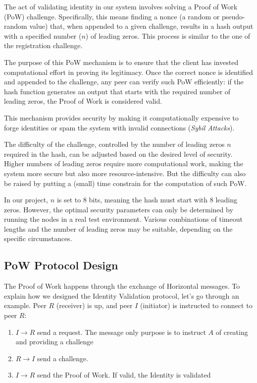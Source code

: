 \documentclass[a4paper,english,10pt,NET]{tumarticle}
\begin{document}
The act of validating identity in our system involves solving a Proof of Work (PoW) challenge. Specifically, this means finding a nonce (a random or pseudo-random value) that, when appended to a given challenge, results in a hash output with a specified number ($n$) of leading zeros. This process is similar to the one of the registration challenge.

The purpose of this PoW mechanism is to ensure that the client has invested computational effort in proving its legitimacy. Once the correct nonce is identified and appended to the challenge, any peer can verify such PoW efficiently: if the hash function generates an output that starts with the required number of leading zeros, the Proof of Work is considered valid.

This mechanism provides security by making it computationally expensive to forge identities or spam the system with invalid connections (\textit{Sybil Attacks}). 

The difficulty of the challenge, controlled by the number of leading zeros $n$ required in the hash, can be adjusted based on the desired level of security. Higher numbers of leading zeros require more computational work, making the system more secure but also more resource-intensive. But the difficulty can also be raised by putting a (small) time constrain for the computation of such PoW.

In our project, $n$ is set to 8 bits, meaning the hash must start with 8 leading zeros. However, the optimal security parameters can only be determined by running the nodes in a real test environment. Various combinations of timeout lengths and the number of leading zeros may be suitable, depending on the specific circumstances.

\subsection{PoW Protocol Design}

The Proof of Work happens through the exchange of Horizontal messages. To explain how we designed the Identity Validation protocol, let's go through an example. Peer $R$ (receiver) is up, and peer $I$ (initiator) is instructed to connect to peer $R$:

\begin{enumerate}
	\item $I \to R$ send a request. The message only purpose is to instruct $A$ of creating and providing a challenge
	\item $R \to I$ send a challenge. 
	\item $I \to R$ send the Proof of Work. If valid, the Identity is validated
\end{enumerate}
\end{document}
